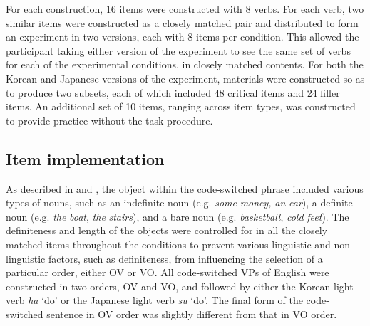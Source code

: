 For each construction, 16 items were constructed with 8 verbs. For each verb, two similar items were constructed as a closely matched pair and distributed to form an experiment in two versions, each with 8 items per condition. This allowed the participant taking either version of the experiment to see the same set of verbs for each of the experimental conditions, in closely matched contents. For both the Korean and Japanese versions of the experiment, materials were constructed so as to produce two subsets, each of which included 48 critical items and 24 filler items. An additional set of 10 items, ranging across item types, was constructed to provide practice without the task procedure. 

\largerpage[2]
\subsection{Item implementation}\label{ch2:sect:2.1.2}

As described in  and , the object within the code-switched phrase included various types of nouns, such as an indefinite noun (e.g. \textit{some} \textit{money,} \textit{an} \textit{ear}), a definite noun (e.g. \textit{the} \textit{boat}, \textit{the} \textit{stairs}), and a bare noun (e.g. \textit{basketball}, \textit{cold} \textit{feet}). The definiteness and length of the objects were controlled for in all the closely matched items throughout the conditions to prevent various linguistic and non-linguistic factors, such as definiteness, from influencing the selection of a particular order, either \ac{OV} or \ac{VO}. All code-switched \ac{VP}s of English were constructed in two orders, \ac{OV} and \ac{VO}, and followed by either the Korean light verb \textit{ha} ‘do’ or the Japanese light verb \textit{su} ‘do’. The final form of the code-switched sentence in \ac{OV} order was slightly different from that in \ac{VO} order. 


